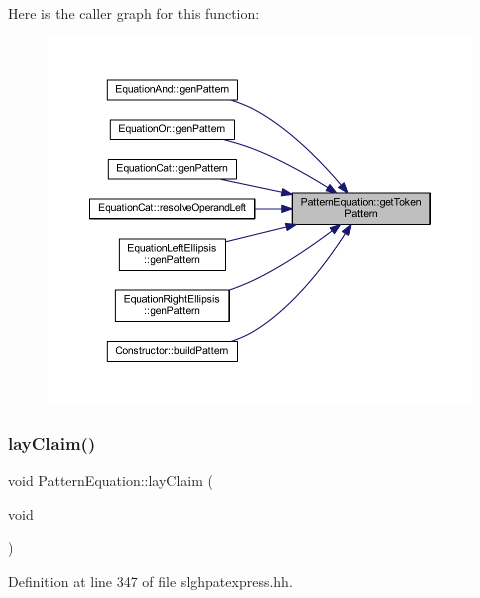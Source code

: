 Here is the caller graph for this function\+:
\nopagebreak
\begin{figure}[H]
\begin{center}
\leavevmode
\includegraphics[width=350pt]{class_pattern_equation_a99e0416a51f10f4291087173a321dc55_icgraph}
\end{center}
\end{figure}
\mbox{\label{class_pattern_equation_a1c5807ba6c66f6c089d9fcc39140f187}} 
\subsubsection{\texorpdfstring{layClaim()}{layClaim()}}
{\footnotesize\ttfamily void Pattern\+Equation\+::lay\+Claim (\begin{DoxyParamCaption}\item[{void}]{ }\end{DoxyParamCaption})\hspace{0.3cm}{\ttfamily [inline]}}



Definition at line 347 of file slghpatexpress.\+hh.

